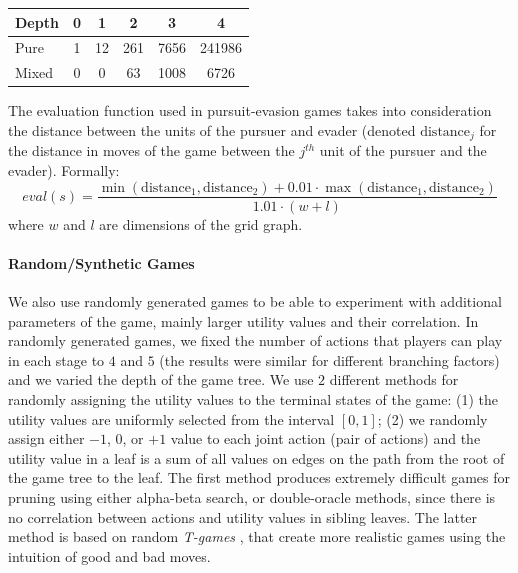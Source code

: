 \vspace{0.1cm}

\begin{center}
\small
\begin{tabular}{|l|c|c|c|c|c|}
\hline Depth & 0 & 1 & 2 & 3 & 4 \\
\hline Pure  & 1 & 12 & 261 & 7656 & 241986 \\
\hline Mixed & 0 & 0 & 63 & 1008 & 6726 \\
\hline
\end{tabular}
\end{center}

\vspace{0.1cm}

The evaluation function used in pursuit-evasion games takes into consideration the distance between the units of the pursuer and evader (denoted $\textrm{distance}_j$ for the distance in moves of the game between the $j^{th}$ unit of the pursuer and the evader). Formally:
$$
eval(s) = \frac{\min(\textrm{distance}_1,\textrm{distance}_2) + 0.01\cdot\max(\textrm{distance}_1,\textrm{distance}_2)}{1.01 \cdot (w+l)}
$$
where $w$ and $l$ are dimensions of the grid graph.

\paragraph{\textbf{Random/Synthetic Games}}
We also use randomly generated games to be able to experiment with additional parameters of the game, mainly larger utility values and their correlation.
In randomly generated games, we fixed the number of actions that players can play in each stage to $4$ and $5$ (the results were similar for different branching factors) and we varied the depth of the game tree.
We use $2$ different methods for randomly assigning the utility values to the terminal states of the game:
(1) the utility values are uniformly selected from the interval $\left[0,1\right]$;
(2) we randomly assign either $-1$, $0$, or $+1$ value to each joint action (pair of actions) and the utility value in a leaf is a sum of all values on edges on the path from the root of the game tree to the leaf.
The first method produces extremely difficult games for pruning using either alpha-beta search, or double-oracle methods, since there is no correlation between actions and utility values in sibling leaves.
The latter method is based on random \emph{T-games} \cite{smith1995}, that create more realistic games using the intuition of good and bad moves.

